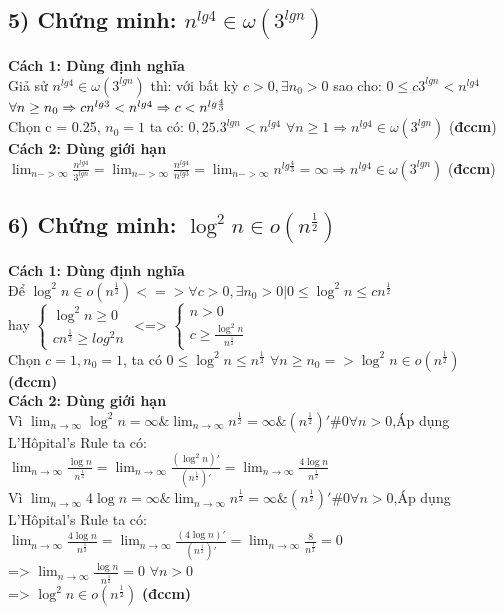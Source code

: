 \documentclass[10pt,a4paper]{article}
\begin{document}
\subsection*{5) Chứng minh: $n^{lg4} \in \omega(3^{lgn})$}
\textbf{Cách 1: Dùng định nghĩa}\\
Giả sử $n^{lg4} \in \omega(3^{lgn})$ thì: với bất kỳ $c > 0,\exists n_0 > 0$ sao cho: $ 0 \leq c3^{lgn} < n^{lg4}$  $\forall n \geq n_0 \\
\Rightarrow cn^{lg3} < n^{lg4} \Rightarrow c < n^{lg\frac{4}{3}}$\\
Chọn c = 0.25, $n_0 = 1$ ta có: $0,25.3^{lgn} < n^{lg4}$ $\forall n \geq 1 \Rightarrow n^{lg4} \in \omega(3^{lgn})$ (\textbf{đccm}) \\
\textbf{Cách 2: Dùng giới hạn}\\
$\lim_{n->\infty}\frac{n^{lg4}}{3^{lgn}} = \lim_{n->\infty}\frac{n^{lg4}}{n^{lg3}} = \lim_{n->\infty}n^{lg\frac{4}{3}} = \infty \Rightarrow n^{lg4} \in \omega(3^{lgn})$ (\textbf{đccm})
\subsection*{6) Chứng minh: $\log^2{n} \in o(n^\frac{1}{2})$}
\textbf{Cách 1: Dùng định nghĩa}\\
Để $\log^2{n} \in o(n^\frac{1}{2}) <=> \forall c >0,\exists n_0 >0 | 0 \leq \log^2{n}\leq cn^\frac{1}{2}$\\ hay $
\begin{cases}
    \log^2{n} \geq 0 \\
    cn^\frac{1}{2} \geq log^2{n}
\end{cases}$
<=> $
\begin{cases}
    n > 0 \\
    c \geq \frac{\log^2{n}}{n^\frac{1}{2}}
\end{cases}$
\\
Chọn $c = 1, n_0 = 1$, ta có $0 \leq \log^2{n} \leq n^\frac{1}{2}$ $\forall n \geq n_0 => \log^2{n} \in o(n^\frac{1}{2})$ \textbf{(đccm)}\\
\textbf{Cách 2: Dùng giới hạn}\\
Vì $\lim_{n\to\infty}{\log^2{n}} = \infty  \& \lim_{n\to\infty}{n^\frac{1}{2}} = \infty \& (n^\frac{1}{2})' \# 0$$\forall n > 0$,Áp dụng L'Hôpital's Rule ta có:\\
$\lim_{n \to \infty}{\frac{\log{n}}{n^\frac{1}{2}}} = \lim_{n \to \infty}{\frac{(\log^2{n})'}{(n^\frac{1}{2})'}} =  \lim_{n \to \infty}{\frac{4\log{n}}{n^\frac{1}{2}}}$ \\
Vì $\lim_{n\to\infty}{4\log{n}} = \infty  \& \lim_{n\to\infty}{n^\frac{1}{2}} = \infty \& (n^\frac{1}{2})' \# 0$$\forall n > 0$,Áp dụng L'Hôpital's Rule ta có:\\
$\lim_{n \to \infty}{\frac{4\log{n}}{n^\frac{1}{2}}} = \lim_{n \to \infty}{\frac{(4\log{n})'}{(n^\frac{1}{2})'}} =  \lim_{n \to \infty}{\frac{8}{n^\frac{1}{2}}} = 0$ \\
=> $\lim_{n \to \infty}{\frac{\log{n}}{n^\frac{1}{2}}} = 0$ $\forall n >0$ \\
=> $\log^2{n} \in o(n^\frac{1}{2})$ \textbf{(đccm)}
\end{document}

